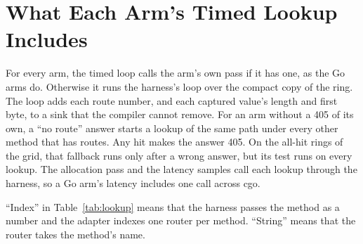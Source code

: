 \section[\appendixname~\thesection]{What Each Arm's Timed Lookup Includes}\label{app:lookup}

For every arm, the timed loop calls the arm's own pass if it has one, as the Go arms do. Otherwise it
runs the harness's loop over the compact copy of the ring. The loop adds each route number, and each
captured value's length and first byte, to a sink that the compiler cannot remove. For an arm without
a 405 of its own, a ``no route'' answer starts a lookup of the same path under every other method
that has routes. Any hit makes the answer 405. On the all-hit rings of the grid, that fallback runs
only after a wrong answer, but its test runs on every lookup. The allocation pass and the latency
samples call each lookup through the harness, so a Go arm's latency includes one call across cgo.

``Index'' in Table~\ref{tab:lookup} means that the harness passes the method as a number and the
adapter indexes one router per method. ``String'' means that the router takes the method's name.

